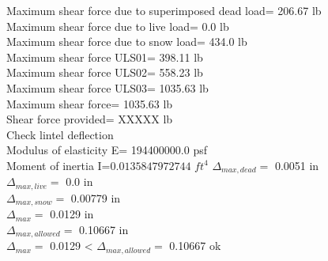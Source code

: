 Maximum shear force due to superimposed dead load=  206.67 lb \\
Maximum shear force due to live load=  0.0 lb \\
Maximum shear force due to snow load=  434.0 lb \\
Maximum shear force ULS01=  398.11 lb \\
Maximum shear force ULS02=  558.23 lb \\
Maximum shear force ULS03=  1035.63 lb \\
Maximum shear force=  1035.63 lb \\
Shear force provided= XXXXX lb \\
Check lintel deflection \\
Modulus of elasticity E=  194400000.0  psf \\
Moment of inertia I=$  0.0135847972744$  $ft^4$
$\Delta_{max,dead} =$  0.0051  in \\
$\Delta_{max,live} =$  0.0  in \\
$\Delta_{max,snow} =$  0.00779  in \\
$\Delta_{max} =$  0.0129  in \\
$\Delta_{max,allowed} =$  0.10667  in \\
$\Delta_{max} =$  0.0129  < $\Delta_{max,allowed} =$  0.10667  ok \\
